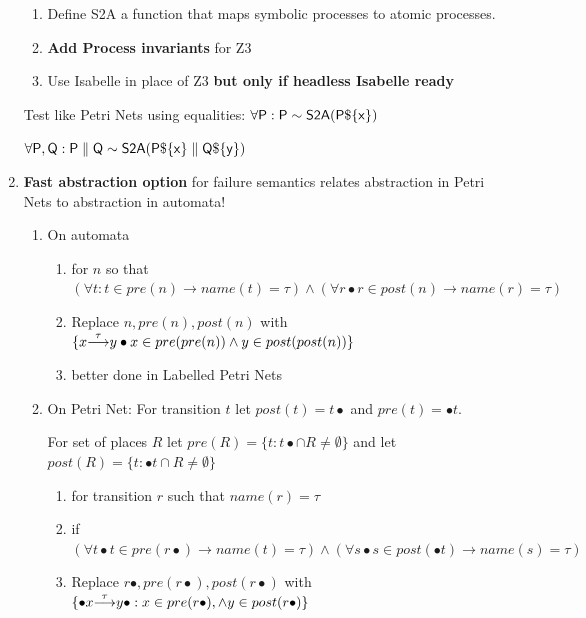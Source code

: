 \documentclass[]{article}
\begin{document}
\begin{enumerate}
\begin{enumerate}
\item Define {\sf S2A} a function that maps symbolic processes to atomic processes.

\item {\bf Add Process invariants} for Z3

\item Use Isabelle in place of Z3  {\bf but only if headless Isabelle ready}
\end{enumerate}
Test like Petri Nets using equalities: $\sf \forall {\sf P} : P  \sim  S2A(P\$\{x\})$

$\sf \forall {\sf P, Q} : P\parallel Q  \sim  S2A(P\$\{x\}\parallel Q\$\{y\})$



\item {\bf Fast abstraction option} for failure semantics relates abstraction in Petri Nets to abstraction in automata!
\begin{enumerate}
\item On automata
\begin{enumerate}
\item for $n$ so that $(\forall t: t \in pre(n) \rightarrow name(t)=\tau) \land (\forall r\bullet r\in post(n) \rightarrow name(r)=\tau)$
\item Replace $n,pre(n),post(n)$ with $\{{x}{\stackrel{\tau}{\longrightarrow}}{y}  \bullet x\in pre(pre(n))\land y\in post(post(n))\}$
\item better done in Labelled Petri Nets
\end{enumerate}
\item On Petri Net:  For transition  $t$ let  $post(t)= t\bullet $ and $pre(t)= \bullet t$.

   For set of places $R $ let $pre(R) = \{t: t\bullet \cap R \neq \emptyset\}$ and let $post(R) = \{t: \bullet t \cap R \neq \emptyset\}$

\begin{enumerate}
\item for transition $r$ such that $name(r) = \tau$

\item  \hspace{0.5cm} if $(\forall t\bullet t \in pre(r\bullet) \rightarrow name(t)=\tau) \land (\forall s\bullet s\in post(\bullet t) \rightarrow name(s)=\tau)$
\item \hspace{1cm} Replace $r\bullet, pre(r\bullet), post(r \bullet)$ with $\{{\bullet x}{\stackrel{\tau}{\longrightarrow}}{y\bullet}  : x\in pre(r\bullet),\land y\in post(r\bullet)\}$
\end{enumerate}
\end{enumerate}


\end{enumerate}
\end{document}
